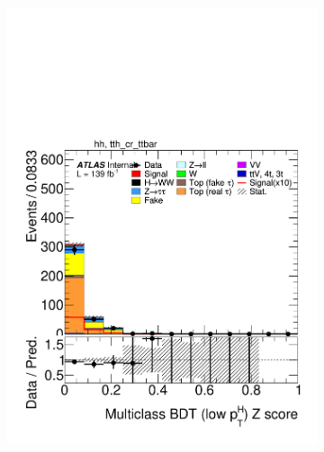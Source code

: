 \begin{figure}[h]
\begin{subfigure}[b]{0.32\textwidth}
    \includegraphics[width=\textwidth]{images/sr_cr_plots/plot_tth_Z_multiclass_lt200_hh_tth_cr_ttbar.pdf}
    \caption{}
  \end{subfigure}


\end{figure}
